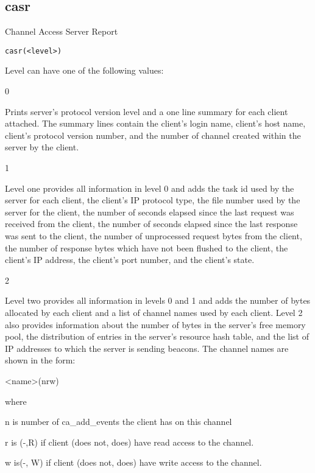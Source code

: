 \subsection{casr}

Channel Access Server Report

\begin{verbatim}
casr(<level>)
\end{verbatim}

Level can have one of the following values:

\begin{description}

\item 0 

Prints server's protocol version level and a one line summary for each client attached. The summary lines 
contain the client's login name, client's host name, client's protocol version number, and the number of 
channel created within the server by the client.

\item 1

Level one provides all information in level 0 and adds the task id used by the server for each client, the 
client's IP protocol type, the file number used by the server for the client, the number of seconds elapsed 
since the last request was received from the client, the number of seconds elapsed since the last response 
was sent to the client, the number of unprocessed request bytes from the client, the number of response bytes 
which have not been flushed to the client, the client's IP address, the client's port number, and the client's 
state.

\item 2

Level two provides all information in levels 0 and 1 and adds the number of bytes allocated by each client 
and a list of channel names used by each client. Level 2 also provides information about the number of bytes 
in the server's free memory pool, the distribution of entries in the server's resource hash table, and the list of 
IP addresses to which the server is sending beacons. The channel names are shown in the form:

\textless{}name\textgreater{}(nrw)

where

\begin{description}
\item n is number of ca\_add\_events the client has on this channel
\item r is (-,R) if client (does not, does) have read access to the channel.
\item w is(-, W) if client (does not, does) have write access to the channel.
\end{description}

\end{description}

